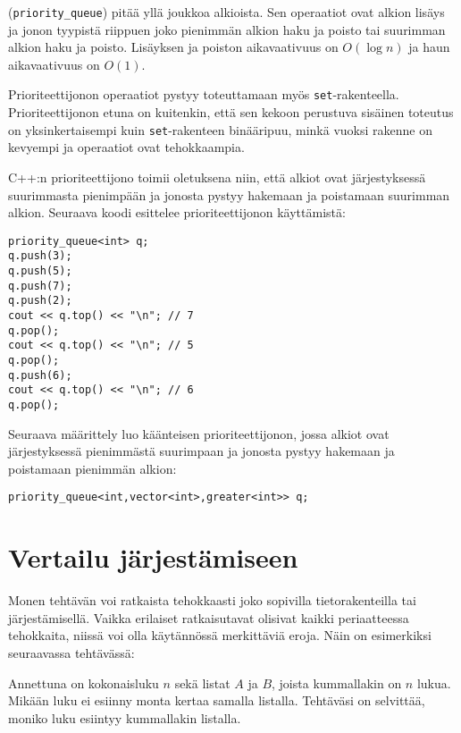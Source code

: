 
 (\texttt{priority\_queue})
pitää yllä joukkoa alkioista.
Sen operaatiot ovat alkion lisäys ja
jonon tyypistä riippuen joko
pienimmän alkion haku ja poisto tai
suurimman alkion haku ja poisto.
Lisäyksen ja poiston aikavaativuus on $O(\log n)$
ja haun aikavaativuus on $O(1)$.

Prioriteettijonon operaatiot
pystyy toteuttamaan myös \texttt{set}-rakenteella.
Prioriteettijonon etuna on kuitenkin,
että sen kekoon perustuva sisäinen
toteutus on yksinkertaisempi
kuin \texttt{set}-rakenteen binääripuu,
minkä vuoksi rakenne on kevyempi ja
operaatiot ovat tehokkaampia.

\begin{samepage}
C++:n prioriteettijono toimii oletuksena niin,
että alkiot ovat järjestyksessä suurimmasta pienimpään
ja jonosta pystyy hakemaan ja poistamaan suurimman alkion.
Seuraava koodi esittelee prioriteettijonon käyttämistä:

\begin{lstlisting}
priority_queue<int> q;
q.push(3);
q.push(5);
q.push(7);
q.push(2);
cout << q.top() << "\n"; // 7
q.pop();
cout << q.top() << "\n"; // 5
q.pop();
q.push(6);
cout << q.top() << "\n"; // 6
q.pop();
\end{lstlisting}
\end{samepage}

Seuraava määrittely luo käänteisen prioriteettijonon,
jossa alkiot ovat järjestyksessä pienimmästä suurimpaan
ja jonosta pystyy hakemaan ja poistamaan pienimmän alkion:

\begin{lstlisting}
priority_queue<int,vector<int>,greater<int>> q;
\end{lstlisting}

\section{Vertailu järjestämiseen}

Monen tehtävän voi ratkaista tehokkaasti joko
sopivilla tietorakenteilla tai järjestämisellä.
Vaikka erilaiset ratkaisutavat olisivat kaikki
periaatteessa tehokkaita, niissä voi olla
käytännössä merkittäviä eroja.
Näin on esimerkiksi seuraavassa tehtävässä:

\begin{task}
Annettuna on kokonaisluku $n$ sekä listat $A$ ja $B$,
joista kummallakin on $n$ lukua.
Mikään luku ei esiinny monta kertaa samalla listalla.
Tehtäväsi on selvittää, moniko luku esiintyy
kummallakin listalla.
\end{task}

